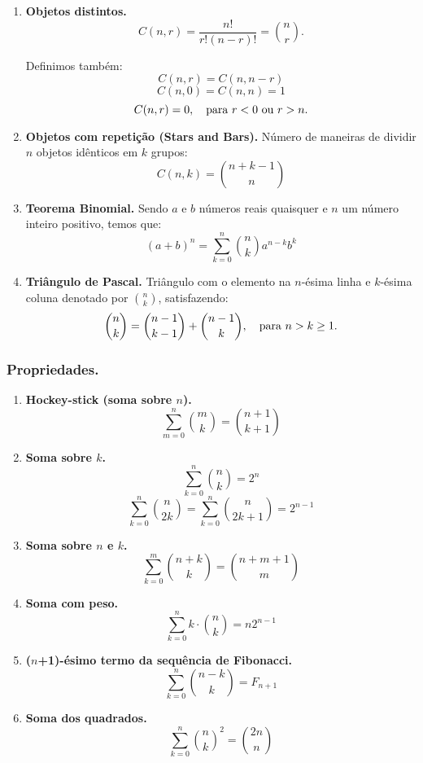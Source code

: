 \begin{enumerate}
    \item \textbf{Objetos distintos.} 
    $$C(n,r) = \frac{n!}{r!(n - r)!} = \binom{n}{r}.$$

    Definimos também:
    $$C(n,r) = C(n, n-r)$$
    $$C(n,0) = C(n,n) = 1$$
    $$C(n,r) = 0, \quad \textnormal{para } r < 0 \textnormal{ ou } r > n.$$

    \item \textbf{Objetos com repetição (Stars and Bars).} Número de maneiras de dividir $n$ objetos idênticos em $k$ grupos:
    $$C(n,k) = \binom{n+k-1}{n}$$

	\item \textbf{Teorema Binomial.} Sendo $a$ e $b$ números reais quaisquer e $n$ um número inteiro positivo, temos que:
	$$(a+b)^n = \sum_{k=0}^{n} \binom{n}{k}a^{n-k}b^{k}$$

    \item \textbf{Triângulo de Pascal.} Triângulo com o elemento na $n$-ésima linha e $k$-ésima coluna denotado por $\binom{n}{k}$, satisfazendo:
    $$\binom{n}{k} = \binom{n-1}{k-1} + \binom{n-1}{k}, \quad \textnormal{para } n > k \ge 1.$$
    
	\end{enumerate}

\subsubsection*{Propriedades.}
\begin{multicols}{2}
    \begin{enumerate}
        \item \textbf{Hockey-stick (soma sobre $n$).}
        $$\sum_{m = 0}^{n} \binom{m}{k} = \binom{n+1}{k+1}$$

        \item \textbf{Soma sobre $k$.}
        $$\sum_{k = 0}^{n} \binom{n}{k} = 2^n$$
        $$\sum_{k = 0}^{n} \binom{n}{2k} = \sum_{k = 0}^{n} \binom{n}{2k+1} = 2^{n-1}$$

        \item \textbf{Soma sobre $n$ e $k$.}
        $$\sum_{k=0}^{m} \binom{n+k}{k} = \binom{n+m+1}{m}$$

        \item \textbf{Soma com peso.}
        $$\sum_{k=0}^{n} k\cdot \binom{n}{k} = n2^{n-1}$$

        \item \textbf{($n$+1)-ésimo termo da sequência de Fibonacci.}
        $$\sum_{k = 0}^{n} \binom{n-k}{k} = F_{n+1}$$

        \item \textbf{Soma dos quadrados.}
        $$\sum_{k = 0}^{n} \binom{n}{k}^2 = \binom{2n}{n}$$
    \end{enumerate}
\end{multicols}
 
